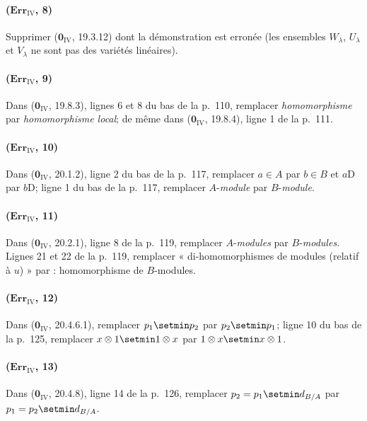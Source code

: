 \paragraph{($\mathbf{Err}_{\mathrm{IV}}$, 8)}
Supprimer ($\mathbf{0}_{\mathrm{IV}}$, 19.3.12) dont la démonstration est erronée
(les ensembles $W_\lambda$, $U_\lambda$ et $V_\lambda$ ne sont pas des
variétés linéaires).

\paragraph{($\mathbf{Err}_{\mathrm{IV}}$, 9)}
Dans ($\mathbf{0}_{\mathrm{IV}}$, 19.8.3), lignes 6 et 8 du bas de la p.~110,
remplacer \emph{homomorphisme} par \emph{homomorphisme local}; de même dans
($\mathbf{0}_{\mathrm{IV}}$, 19.8.4), ligne 1 de la p.~111.

\paragraph{($\mathbf{Err}_{\mathrm{IV}}$, 10)}
Dans ($\mathbf{0}_{\mathrm{IV}}$, 20.1.2), ligne 2 du bas de la p.~117,
remplacer $a\in A$ par $b\in B$ et $a\mathrm{D}$ par $b\mathrm{D}$; ligne 1 du bas de la
p.~117, remplacer $A$-\emph{module} par $B$-\emph{module}.

\paragraph{($\mathbf{Err}_{\mathrm{IV}}$, 11)}
Dans ($\mathbf{0}_{\mathrm{IV}}$, 20.2.1), ligne 8 de la p.~119, remplacer
$A$-\emph{modules} par $B$-\emph{modules}. Lignes 21 et 22 de la p.~119, remplacer
« di-homomorphismes de modules (relatif à $u$) » par : homomorphisme
de $B$-modules.

\paragraph{($\mathbf{Err}_{\mathrm{IV}}$, 12)}
Dans ($\mathbf{0}_{\mathrm{IV}}$, 20.4.6.1), remplacer $p_1\setmin p_2$ par $p_2\setmin p_1$;
ligne 10 du bas de la p.~125, remplacer $x\otimes1\setmin 1\otimes x$ par
$1\otimes x\setmin x\otimes1$.

\paragraph{($\mathbf{Err}_{\mathrm{IV}}$, 13)}
Dans ($\mathbf{0}_{\mathrm{IV}}$, 20.4.8), ligne 14 de la p.~126, remplacer
$p_2=p_1\setmin d_{B/A}$ par $p_1=p_2\setmin d_{B/A}$.

